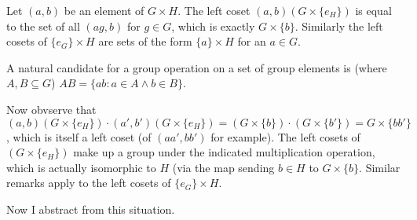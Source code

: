 \documentclass[12pt]{article}
\begin{document}
Let $(a,b)$ be an element of $G \times H$.  The left coset $(a,b)(G \times \{e_H\})$ is equal to the set of all
$(ag,b)$ for $g \in G$, which is exactly $G \times \{b\}$.  Similarly the left cosets of $\{e_G\} \times H$ are sets
of the form $\{a\} \times H$ for an $a \in G$.

A natural candidate for a group operation on a set of group elements is (where $A,B \subseteq G$) $AB = \{ab:a \in A \wedge b \in B\}$.

Now obvserve that $(a,b)(G \times \{e_H\}) \cdot (a',b')(G \times \{e_H\}) = (G \times \{b\})\cdot (G \times \{b'\}) = G \times \{bb'\}$, which is itself a left coset (of $(aa',bb')$ for example).  The left cosets of $(G \times \{e_H\})$ make up a group under the indicated multiplication operation, which is actually isomorphic to $H$ (via the map sending $b \in H$ to $G \times \{b\}$.  Similar remarks apply to the left cosets of $\{e_G\} \times H$.

Now I abstract from this situation.
\end{document}
